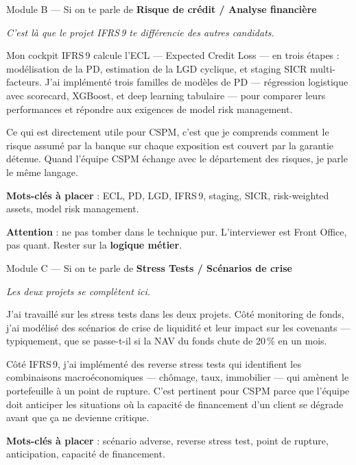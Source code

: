 \documentclass[11pt,a4paper]{article}
\begin{document}
\vspace{6pt}

\begin{modulebox}{Module B --- Si on te parle de \textbf{Risque de cr\'edit / Analyse financi\`ere}}

\textit{C'est l\`a que le projet IFRS\,9 te diff\'erencie des autres candidats.}

\begin{verbatimbox}
\og Mon cockpit IFRS\,9 calcule l'ECL --- Expected Credit Loss --- en trois
\'etapes : mod\'elisation de la PD, estimation de la LGD cyclique, et staging
SICR multi-facteurs. J'ai impl\'ement\'e trois familles de mod\`eles de PD
--- r\'egression logistique avec scorecard, XGBoost, et deep learning
tabulaire --- pour comparer leurs performances et r\'epondre aux exigences
de model risk management.

Ce qui est directement utile pour CSPM, c'est que je comprends comment
le risque assum\'e par la banque sur chaque exposition est couvert par la
garantie d\'etenue. Quand l'\'equipe CSPM \'echange avec le d\'epartement
des risques, je parle le m\^eme langage. \fg{}
\end{verbatimbox}

\textbf{Mots-cl\'es \`a placer} : ECL, PD, LGD, IFRS\,9, staging, SICR,
risk-weighted assets, model risk management.

\textbf{Attention} : ne pas tomber dans le technique pur. L'interviewer est
Front Office, pas quant. Rester sur la \textbf{logique m\'etier}.
\end{modulebox}

\vspace{6pt}

\begin{modulebox}{Module C --- Si on te parle de \textbf{Stress Tests / Sc\'enarios de crise}}

\textit{Les deux projets se compl\`etent ici.}

\begin{verbatimbox}
\og J'ai travaill\'e sur les stress tests dans les deux projets. C\^ot\'e
monitoring de fonds, j'ai mod\'elis\'e des sc\'enarios de crise de liquidit\'e
et leur impact sur les covenants --- typiquement, que se passe-t-il si la
NAV du fonds chute de 20\,\% en un mois.

C\^ot\'e IFRS\,9, j'ai impl\'ement\'e des reverse stress tests qui
identifient les combinaisons macro\'economiques --- ch\^omage, taux,
immobilier --- qui am\`enent le portefeuille \`a un point de rupture.
C'est pertinent pour CSPM parce que l'\'equipe doit anticiper les
situations o\`u la capacit\'e de financement d'un client se d\'egrade
avant que \c{c}a ne devienne critique. \fg{}
\end{verbatimbox}

\textbf{Mots-cl\'es \`a placer} : sc\'enario adverse, reverse stress test,
point de rupture, anticipation, capacit\'e de financement.
\end{modulebox}
\end{document}
